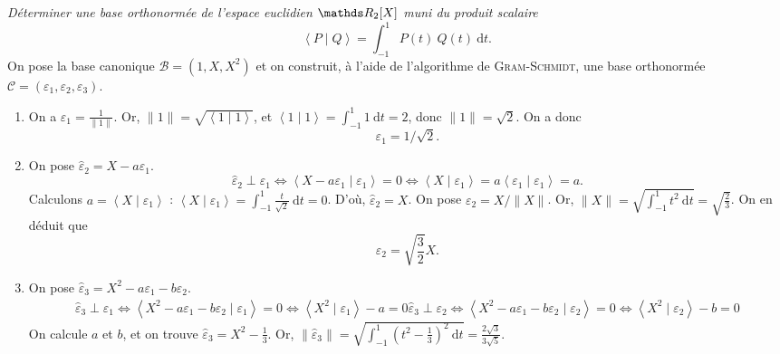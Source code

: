 \begin{exo}
	\textsl{Déterminer une base orthonormée de l'espace euclidien $\R_2[X]$ muni du produit scalaire} \[
		\left<P \mid Q \right> = \int_{-1}^1 P(t)\:Q(t)~\mathrm{d}t
	.\]
	On pose la base canonique $\mathcal{B} = (1, X, X^2)$\/ et on construit, à l'aide de l'algorithme de \textsc{Gram}-\textsc{Schmidt}, une base orthonormée $\mathcal{C} = (\varepsilon_1, \varepsilon_2, \varepsilon_3)$.
	\begin{enumerate}
		\item On a $\varepsilon_1 = \frac{1}{\|1\|}$. Or, $\|1\| = \sqrt{\left<1 \mid 1 \right>}$, et $\left<1 \mid 1 \right> = \int_{-1}^{1} 1~\mathrm{d}t = 2$, donc $\|1\| = \sqrt{2}$. On a donc \[
				\varepsilon_1=1 / \sqrt{2}.
			\]
		\item On pose $\hat\varepsilon_2 = X - a\varepsilon_1$. \[
			\hat\varepsilon_2 \perp \varepsilon_1 \iff \left<X - a \varepsilon_1  \mid \varepsilon_1 \right> = 0
			\iff \left<X  \mid \varepsilon_1 \right> = a \left<\varepsilon_1  \mid \varepsilon_1 \right> = a
		.\]
		Calculons $a = \left<X  \mid \varepsilon_1 \right>$ : $\left<X  \mid \varepsilon_1 \right> = \int_{-1}^{1} \frac{t}{\sqrt{2}}~\mathrm{d}t = 0$. D'où, $\hat\varepsilon_2 = X$. On pose $\varepsilon_2 = X / \|X\|$. Or, $\|X\| = \sqrt{\int_{-1}^{1} t^2~\mathrm{d}t} = \sqrt{\frac{2}{3}}$. On en déduit que \[
				\varepsilon_2 = \sqrt{\frac{3}{2}} X
			.\]
		\item On pose $\hat\varepsilon_3 = X^2 - a \varepsilon_1 - b\varepsilon_2$.
			\begin{gather*}
				\hat\varepsilon_3\perp \varepsilon_1 \iff \left<X^2 - a \varepsilon_1 - b \varepsilon_2  \mid \varepsilon_1 \right> = 0 \iff \left<X^2  \mid \varepsilon_1 \right> - a = 0
				\hat\varepsilon_3\perp \varepsilon_2 \iff \left<X^2 - a \varepsilon_1 - b \varepsilon_2  \mid \varepsilon_2 \right> = 0 \iff \left<X^2  \mid \varepsilon_2 \right> - b = 0
			\end{gather*}
			On calcule $a$\/ et $b$, et on trouve $\hat\varepsilon_3 = X^2 - \frac{1}{3}$. Or, $\|\hat \varepsilon_3\| = \sqrt{\int_{-1}^{1} \left( t^2 - \frac{1}{3} \right)^2~\mathrm{d}t} = \frac{2\sqrt{3}}{3\sqrt{5}}$.
	\end{enumerate}
\end{exo}

